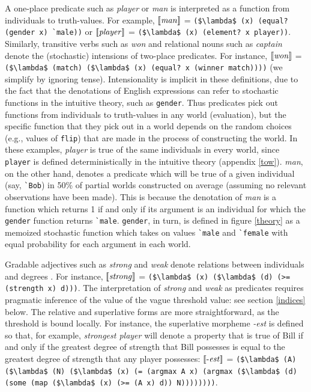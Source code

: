 \documentclass[pdfextras]{handbook}
\newcommand{\llbracket}{\ensuremath{\left [\!\left [}}%
\newcommand{\rrbracket}{\ensuremath{\right ]\!\right ]}}
\providecommand{\sv}[1]{\ensuremath{\llbracket \mathit{#1} \rrbracket}}
\begin{document}
A one-place predicate such as \emph{player} or \emph{man} is interpreted as a function from individuals to truth-values. 
For example, 
\sv{man} = \lstinline[mathescape]{($\lambda$ (x) (equal? (gender x) `male))} or \sv{player} = \lstinline[mathescape]{($\lambda$ (x) (element? x player))}.
Similarly, transitive verbs such as \emph{won} and relational nouns such as \emph{captain} denote the (stochastic) intensions of two-place predicates. For instance, \sv{won} = \lstinline[mathescape]{($\lambda$ (match) ($\lambda$ (x) (equal? x (winner match))))} (we simplify by ignoring tense).
%
Intensionality is implicit in these definitions, due to the fact that the denotations of English expressions can refer to stochastic functions in the intuitive theory, such as \lstinline{gender}.
Thus predicates pick out functions from individuals to truth-values in any world (evaluation), but the specific function that they pick out in a world depends on the random choices (e.g., values of \lstinline{flip}) that are made in the process of constructing the world. 
In these examples, \emph{player} is true of the same individuals in every world, since \lstinline{player} is defined deterministically in the intuitive theory (appendix \ref{tow}). 
\emph{man}, on the other hand, denotes a predicate which will be true of a given individual (say, \lstinline{`Bob}) in 50\% of partial worlds constructed on average (assuming no relevant observations have been made). 
This is because the denotation of \emph{man} is a function which returns 1 if and only if its argument is an individual for which the \lstinline{gender} function returns \lstinline{`male}. 
\lstinline{gender}, in turn, is defined in figure \ref{theory} as a memoized stochastic function which takes on values \lstinline{`male} and \lstinline{`female} with equal probability for each argument in each world. 

Gradable adjectives such as \emph{strong} and \emph{weak} denote relations between individuals and degrees \citep[][etc.]{cresswell76,vonstechow84}. 
For instance, \sv{strong} = \lstinline[mathescape]{($\lambda$ (x) ($\lambda$ (d) (>= (strength x) d)))}.
The interpretation of \emph{strong} and \emph{weak} as predicates requires pragmatic inference of the value of the vague threshold value: see section \ref{indices} below.
The relative and superlative forms are more straightforward, as the threshold is bound locally. For instance, the superlative morpheme \emph{-est} is defined so that, for example, \emph{strongest player} will denote a property that is true of Bill if and only if the greatest degree of strength that Bill possesses is equal to the greatest degree of strength that any player possesses: 
 \sv{\text{-}est} = \lstinline[mathescape]{($\lambda$ (A) ($\lambda$ (N) ($\lambda$ (x) (= (argmax A x) (argmax ($\lambda$ (d) (some (map ($\lambda$ (x) (>= (A x) d)) N))))))))}.
\end{document}

